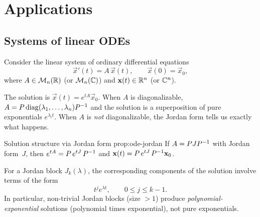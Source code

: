 \section{Applications}\label{sec:jordan-applications}

\subsection{Systems of linear ODEs}\label{subsec:jordan-ode}


Consider the linear system of ordinary differential equations
\begin{equation}\label{eq:ode-system}
  \vec{x}'(t) = A\,\vec{x}(t), \qquad \vec{x}(0) = \vec{x}_0,
\end{equation}
where $A \in \mathcal{M}_n({\mathbb{R}})$ (or $\mathcal{M}_n({\mathbb{C}})$) and
$\mathbf{x}(t) \in {\mathbb{R}}^n$ (or ${\mathbb{C}}^n$).

The solution is
$\vec{x}(t) = e^{tA}\vec{x}_0$.
When $A$ is diagonalizable, $A = P\operatorname{diag}(\lambda_1,\ldots,\lambda_n)
{P}^{-1}$ and the solution is a superposition of pure exponentials
$e^{\lambda_i t}$.  When $A$ is \emph{not} diagonalizable, the Jordan
form tells us exactly what happens.

\begin{proposition}{Solution structure via Jordan form}%
{prop:ode-jordan}
If $A = PJ{P}^{-1}$ with Jordan form~$J$, then
$e^{tA} = P\,e^{tJ}\,{P}^{-1}$ and
$\mathbf{x}(t) = P\,e^{tJ}\,{P}^{-1}\mathbf{x}_0$.

For a Jordan block $J_k(\lambda)$, the corresponding components of
the solution involve terms of the form
\[
  t^j e^{\lambda t}, \qquad 0 \leq j \leq k-1.
\]
In particular, non-trivial Jordan blocks (size $> 1$) produce
\emph{polynomial-exponential} solutions (polynomial times
exponential), not pure exponentials.
\end{proposition}

